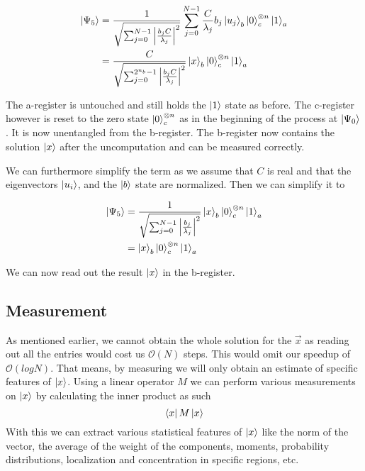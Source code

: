 \begin{equation}
\begin{split}
\ket{\Psi_5} &= \frac {1} {\sqrt{\sum_{j=0}^{N-1} \left| \frac{b_jC} {\lambda_j}\right|^2}}
\sum_{j=0}^{N-1}\frac{ C}{\lambda_j}   b_j \ket{u_j}_b \ket{0}_c^{\otimes n} \ket{1}_a\\
&= \frac {C} {\sqrt{\sum_{j=0}^{2^{n_b}-1} \left| \frac{b_jC} {\lambda_j}\right|^2}}
\ket{x}_b \ket{0}^{\otimes n}_c \ket{1}_a
\end{split}
\end{equation}

The a-register is untouched and still holds the $\ket 1$ state as before. 
The c-register however is reset to the zero state $\ket{0}^{\otimes n}_c$ as in the beginning of the process at $\ket {\Psi_0}$. 
It is now unentangled from the b-register.
The b-register now contains the solution $\ket x$ after the uncomputation and can be measured correctly.

We can furthermore simplify the term as we assume that  $C$ is real and that the eigenvectors $\ket{u_i}$, and the $\ket b$ state are normalized.
Then we can simplify it to

\begin{equation}
\begin{split}
\ket{\Psi_5} &= \frac {1} {\sqrt{\sum_{j=0}^{N-1} \left| \frac{b_j} {\lambda_j}\right|^2}}
\ket{x}_b \ket{0}^{\otimes n}_c \ket{1}_a\\
&= \ket{x}_b \ket{0}^{\otimes n}_c \ket{1}_a
\end{split}
\end{equation}

We can now read out the result $\ket x$ in the b-register.

\subsection{Measurement}
As mentioned earlier, we cannot obtain the whole solution for the $\vec x$ as reading out all the entries would cost us $\mathcal{O}(N)$ steps.
This would omit our speedup of $\mathcal{O}(log N)$. 
That means, by measuring we will only obtain an estimate of specific features of $\ket x$.
Using a linear operator $M$ we can perform various measurements on $\ket x$ by calculating the inner product as such
\begin{equation}
    \bra x M \ket x
\end{equation}
With this we can extract various statistical features of $\ket x$ like the norm of the vector, the average of the weight of the components, moments, probability distributions, localization and concentration in specific regions, etc.


























